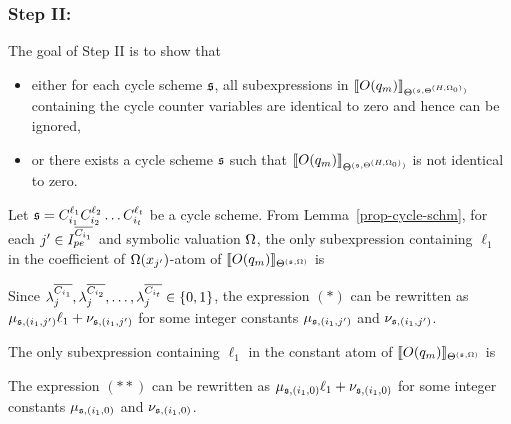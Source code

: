 \subsubsection{Step II:}
The goal of Step II is to show that 
\begin{itemize}
\item either for each cycle scheme ${\mathfrak{s} }$, all subexpressions in $\llbracket O(q_{m})\rrbracket_{\Theta^{({\mathfrak{s} },\Theta^{(H,\Omega_0)})}}$ containing the cycle counter variables are identical to zero and hence can be ignored, 
\item or  there exists a cycle scheme ${\mathfrak{s} }$ such that $\llbracket O(q_{m})\rrbracket_{\Theta^{({\mathfrak{s} },\Theta^{(H,\Omega_0)})}}$ is not identical to zero. 
\end{itemize}
%
Let ${\mathfrak{s} }=C_{i_1}^{\ell_1} C_{i_2}^{\ell_2} \dots C_{i_t}^{\ell_t}$ be a cycle scheme. From Lemma~\ref{prop-cycle-schm}, for each $j'\in I^{\overline{C_{i_1}}}_{pe}$ and symbolic valuation $\Omega$, the only subexpression containing $\ell_1$ in the coefficient of $\Omega(x_{j'})$-atom of $\llbracket O(q_{m})\rrbracket_{\Theta^{({\mathfrak{s} },\Omega)}}$ is
\begin{center}
\end{center}
Since $\lambda^{\overline{C_{i_1}}}_{j}, \lambda^{\overline{C_{i_2}}}_{j}, \dots, \lambda^{\overline{C_{i_t}}}_{j} \in \{0, 1\}$, the expression $(\ast)$  can be rewritten as  
 $\mu_{{\mathfrak{s} }, (i_1,j')} \ell_1 + \nu_{{\mathfrak{s} }, (i_1,j')}$ for some integer constants $\mu_{{\mathfrak{s} }, (i_1,j')}$ and $\nu_{{\mathfrak{s} }, (i_1,j')}$. 
 
The only subexpression containing $\ell_1$ in the constant atom of  $\llbracket O(q_{m})\rrbracket_{\Theta^{({\mathfrak{s} },\Omega)}}$ is
\begin{center}
\end{center}
%
The expression $(\ast\ast)$ can be rewritten as $\mu_{{\mathfrak{s} },(i_1,0)} \ell_1 + \nu_{{\mathfrak{s} },(i_1,0)}$ for some integer constants $\mu_{{\mathfrak{s} }, (i_1,0)}$ and $\nu_{{\mathfrak{s} }, (i_1,0)}$. 

